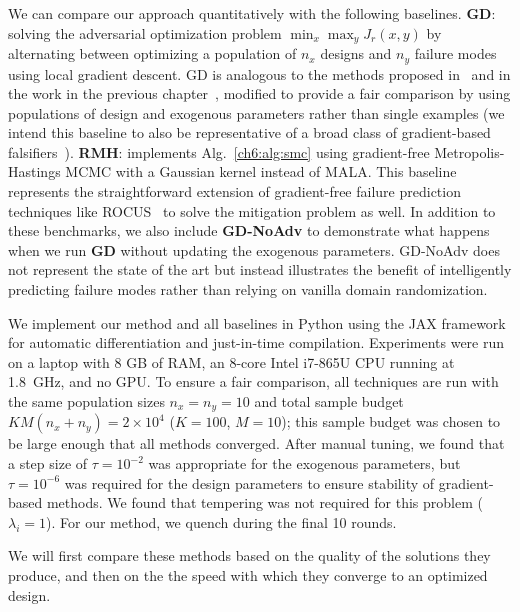 We can compare our approach quantitatively with the following baselines. \textbf{GD}: solving the adversarial optimization problem $\min_x \max_y J_r(x, y)$ by alternating between optimizing a population of $n_x$ designs and $n_y$ failure modes using local gradient descent. GD is analogous to the methods proposed in~\cite{dontiAdversariallyRobustLearning2021} and in the work in the previous chapter~\cite{dawsonRobustCounterexampleguidedOptimization2022}, modified to provide a fair comparison by using populations of design and exogenous parameters rather than single examples (we intend this baseline to also be representative of a broad class of gradient-based falsifiers~\cite{xuAdversarialAttacksDefenses2020}). \textbf{RMH}: implements Alg.~\ref{ch6:alg:smc} using gradient-free Metropolis-Hastings MCMC with a Gaussian kernel instead of MALA. This baseline represents the straightforward extension of gradient-free failure prediction techniques like ROCUS~\cite{zhouRoCUSRobotController2021} to solve the mitigation problem as well. In addition to these benchmarks, we also include \textbf{GD-NoAdv} to demonstrate what happens when we run \textbf{GD} without updating the exogenous parameters. GD-NoAdv does not represent the state of the art but instead illustrates the benefit of intelligently predicting failure modes rather than relying on vanilla domain randomization.

We implement our method and all baselines in Python using the JAX framework for automatic differentiation and just-in-time compilation. Experiments were run on a laptop with 8 GB of RAM, an 8-core Intel i7-865U CPU running at \SI{1.8}{GHz}, and no GPU. To ensure a fair comparison, all techniques are run with the same population sizes $n_x = n_y = 10$ and total sample budget $KM(n_x + n_y) = 2\times 10^4$ ($K = 100$, $M = 10$); this sample budget was chosen to be large enough that all methods converged. After manual tuning, we found that a step size of $\tau = 10^{-2}$ was appropriate for the exogenous parameters, but $\tau = 10^{-6}$ was required for the design parameters to ensure stability of gradient-based methods. We found that tempering was not required for this problem ($\lambda_i = 1$). For our method, we quench during the final 10 rounds.

We will first compare these methods based on the quality of the solutions they produce, and then on the the speed with which they converge to an optimized design.

